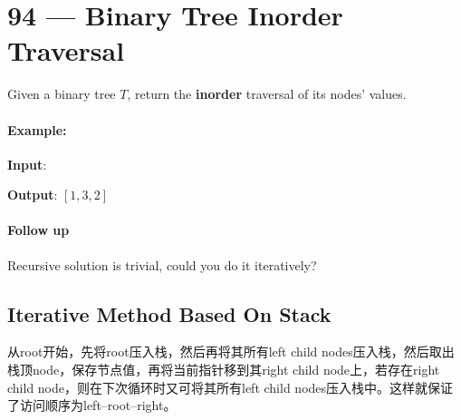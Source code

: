 \section{94 --- Binary Tree Inorder Traversal}
Given a binary tree $T$, return the \textbf{inorder} traversal of its nodes' values.
\paragraph{Example:}
\begin{flushleft}
\textbf{Input}: 
\begin{figure}[H]
\end{figure}
\textbf{Output}: $[1,3,2]$
\end{flushleft}
\paragraph{Follow up}
\begin{flushleft}
Recursive solution is trivial, could you do it iteratively?
\end{flushleft}
\subsection{Iterative Method Based On Stack}
从root开始，先将root压入栈，然后再将其所有left child nodes压入栈，然后取出栈顶node，保存节点值，再将当前指针移到其right child node上，若存在right child node，则在下次循环时又可将其所有left child nodes压入栈中。这样就保证了访问顺序为left--root--right。
